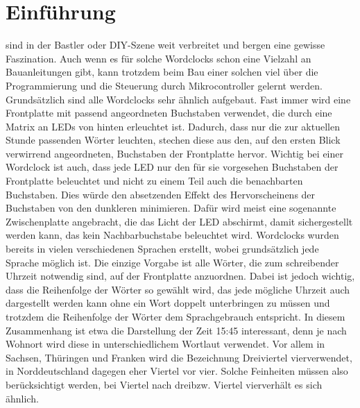 \documentclass[12pt,journal,compsoc]{IEEEtran}
\begin{document}
%


\section{Einführung}

 sind in der Bastler oder DIY-Szene weit verbreitet und bergen eine gewisse Faszination. Auch wenn es für solche Wordclocks schon eine Vielzahl an Bauanleitungen gibt, kann trotzdem beim Bau einer solchen viel über die Programmierung und die Steuerung durch Mikrocontroller gelernt werden.
Grundsätzlich sind alle Wordclocks sehr ähnlich aufgebaut. Fast immer wird eine Frontplatte mit passend angeordneten  Buchstaben verwendet, die durch eine Matrix an LEDs von hinten erleuchtet ist. Dadurch, dass nur die zur aktuellen Stunde passenden   Wörter leuchten, stechen diese aus den, auf den ersten Blick verwirrend angeordneten, Buchstaben der Frontplatte hervor. Wichtig bei einer Wordclock ist auch, dass jede LED nur den für sie vorgesehen Buchstaben der Frontplatte beleuchtet und nicht zu einem Teil auch die benachbarten Buchstaben. Dies würde den absetzenden Effekt des Hervorscheinens der Buchstaben von den dunkleren minimieren. Dafür wird meist eine sogenannte Zwischenplatte angebracht, die das Licht der LED abschirmt, damit sichergestellt werden kann, das kein Nachbarbuchstabe beleuchtet wird.
Wordclocks wurden bereits in vielen verschiedenen Sprachen erstellt, wobei  grundsätzlich jede Sprache möglich ist. Die einzige Vorgabe ist alle Wörter, die zum \glqq schreiben\grqq der Uhrzeit notwendig sind, auf der Frontplatte anzuordnen. Dabei ist jedoch wichtig, dass die Reihenfolge der Wörter so gewählt wird, das jede mögliche Uhrzeit auch dargestellt werden kann ohne ein Wort doppelt unterbringen zu müssen und trotzdem die Reihenfolge der Wörter dem Sprachgebrauch entspricht. In diesem Zusammenhang ist etwa die Darstellung der Zeit 15:45 interessant, denn je nach Wohnort wird diese in unterschiedlichem Wortlaut verwendet. Vor allem in Sachsen, Thüringen und Franken wird die Bezeichnung \glqq Dreiviertel vier\grqq verwendet, in Norddeutschland dagegen eher \glqq Viertel vor vier\grqq. Solche Feinheiten müssen also berücksichtigt werden, bei \glqq Viertel nach drei\grqq bzw. \glqq Viertel vier\grqq verhält es sich ähnlich.
\end{document}
